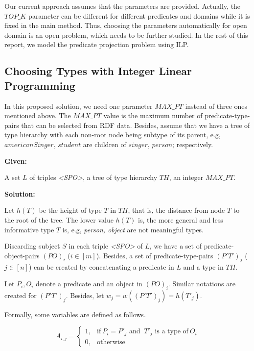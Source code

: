 \documentclass{acm_proc_article-sp}
\begin{document}
Our current approach assumes that the parameters are provided. Actually, the $TOP\_K$ parameter can be different for different predicates and domains while it is fixed in the main method. Thus, choosing the parameters automatically for open domain is an open problem, which needs to be further studied. In the rest of this report, we model the predicate projection problem using ILP.

\subsection{Choosing Types with Integer Linear Programming}

In this proposed solution, we need one parameter $MAX\_PT$ instead of three ones mentioned above. The $MAX\_PT$ value is the maximum number of predicate-type-pairs that can be selected from RDF data. Besides, assume that we have a tree of type hierarchy with each non-root node being subtype of its parent, e.g, $americanSinger$, $student$ are children of $singer$, $person$; respectively.

\textbf{Given:}

A set $L$ of triples \textit{<SPO>}, a tree of type hierarchy $TH$, an integer $MAX\_PT$.

\textbf{Solution:}

Let $h(T)$ be the height of type $T$ in $TH$, that is, the distance from node $T$ to the root of the tree. The lower value $h(T)$ is, the more general and less informative type $T$ is, e.g, \textit{person, object} are not meaningful types.

Discarding subject $S$ in each triple \textit{<SPO>} of $L$, we have a set of predicate-object-pairs $(PO)_{i}$ ($i \in [m]$). Besides, a set of predicate-type-pairs $(P'T')_{j}$ ($j \in [n]$) can be created by concatenating a predicate in $L$ and a type in $TH$.

Let $P_{i}, O_{i}$ denote a predicate and an object in $(PO)_{i}$. Similar notations are created for $(P'T')_{j}$. Besides, let $w_{j} = w((P'T')_{j}) = h(T'_{j})$.

Formally, some variables are defined as follows.

\begin{equation}
    A_{i,j} =
    \begin{cases}
      1, & \text{if}\ P_{i} = P'_{j}  \text{ and }\ T'_{j} \text{ is a type of}\ O_{i}\\
      0, & \text{otherwise}
    \end{cases}
\end{equation}
\end{document}
